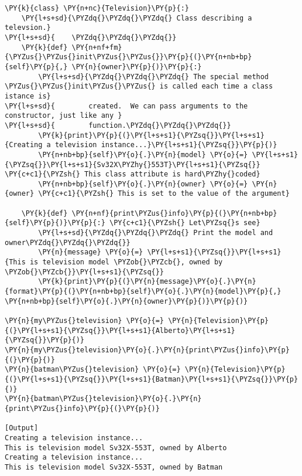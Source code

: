 \begin{Verbatim}[label=\makebox{\url{https://github.com/lucabaldini/cmepda/tree/master/slides/latex/snippets/class\_constructor.py}},commandchars=\\\{\}]
\PY{k}{class} \PY{n+nc}{Television}\PY{p}{:}  
    \PY{l+s+sd}{\PYZdq{}\PYZdq{}\PYZdq{} Class describing a televsion.}
\PY{l+s+sd}{    \PYZdq{}\PYZdq{}\PYZdq{}}
    \PY{k}{def} \PY{n+nf+fm}{\PYZus{}\PYZus{}init\PYZus{}\PYZus{}}\PY{p}{(}\PY{n+nb+bp}{self}\PY{p}{,} \PY{n}{owner}\PY{p}{)}\PY{p}{:}
        \PY{l+s+sd}{\PYZdq{}\PYZdq{}\PYZdq{} The special method \PYZus{}\PYZus{}init\PYZus{}\PYZus{} is called each time a class istance is}
\PY{l+s+sd}{        created.  We can pass arguments to the constructor, just like any }
\PY{l+s+sd}{        function.\PYZdq{}\PYZdq{}\PYZdq{}}
        \PY{k}{print}\PY{p}{(}\PY{l+s+s1}{\PYZsq{}}\PY{l+s+s1}{Creating a television instance...}\PY{l+s+s1}{\PYZsq{}}\PY{p}{)}
        \PY{n+nb+bp}{self}\PY{o}{.}\PY{n}{model} \PY{o}{=} \PY{l+s+s1}{\PYZsq{}}\PY{l+s+s1}{Sv32X\PYZhy{}553T}\PY{l+s+s1}{\PYZsq{}} \PY{c+c1}{\PYZsh{} This class attribute is hard\PYZhy{}coded}
        \PY{n+nb+bp}{self}\PY{o}{.}\PY{n}{owner} \PY{o}{=} \PY{n}{owner} \PY{c+c1}{\PYZsh{} This is set to the value of the argument}
    
    \PY{k}{def} \PY{n+nf}{print\PYZus{}info}\PY{p}{(}\PY{n+nb+bp}{self}\PY{p}{)}\PY{p}{:} \PY{c+c1}{\PYZsh{} Let\PYZsq{}s see}
        \PY{l+s+sd}{\PYZdq{}\PYZdq{}\PYZdq{} Print the model and owner\PYZdq{}\PYZdq{}\PYZdq{}}
        \PY{n}{message} \PY{o}{=} \PY{l+s+s1}{\PYZsq{}}\PY{l+s+s1}{This is television model \PYZob{}\PYZcb{}, owned by \PYZob{}\PYZcb{}}\PY{l+s+s1}{\PYZsq{}}
        \PY{k}{print}\PY{p}{(}\PY{n}{message}\PY{o}{.}\PY{n}{format}\PY{p}{(}\PY{n+nb+bp}{self}\PY{o}{.}\PY{n}{model}\PY{p}{,} \PY{n+nb+bp}{self}\PY{o}{.}\PY{n}{owner}\PY{p}{)}\PY{p}{)}

\PY{n}{my\PYZus{}television} \PY{o}{=} \PY{n}{Television}\PY{p}{(}\PY{l+s+s1}{\PYZsq{}}\PY{l+s+s1}{Alberto}\PY{l+s+s1}{\PYZsq{}}\PY{p}{)}
\PY{n}{my\PYZus{}television}\PY{o}{.}\PY{n}{print\PYZus{}info}\PY{p}{(}\PY{p}{)}
\PY{n}{batman\PYZus{}television} \PY{o}{=} \PY{n}{Television}\PY{p}{(}\PY{l+s+s1}{\PYZsq{}}\PY{l+s+s1}{Batman}\PY{l+s+s1}{\PYZsq{}}\PY{p}{)}
\PY{n}{batman\PYZus{}television}\PY{o}{.}\PY{n}{print\PYZus{}info}\PY{p}{(}\PY{p}{)}

[Output]
Creating a television instance...
This is television model Sv32X-553T, owned by Alberto
Creating a television instance...
This is television model Sv32X-553T, owned by Batman
\end{Verbatim}